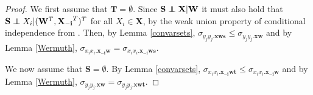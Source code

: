 \documentclass[11pt,a4paper]{article}
\theoremstyle{definition}
\theoremstyle{remark}
\newcommand\ci{\protect\mathpalette{\protect\independenT}{\perp}}
\def\independenT#1#2{\mathrel{\rlap{$#1#2$}\mkern2mu{#1#2}}}
\begin{document}
\begin{proof}

We first assume that $\mathbf{T} = \emptyset$. Since $\mathbf{S} \ci \mathbf{X} | \mathbf{W}$ it must also hold that $\mathbf{S} \ci X_i | (\mathbf{W}^T, \mathbf{X_{-i}}^T)^T$ for all $X_i \in \mathbf{X}$, by the weak union property of conditional independence from \cite{dawid1979conditional}. Then,  by Lemma \ref{convarsets}, $\sigma_{y_jy_j.\mathbf{xws}} \leq \sigma_{y_jy_j.\mathbf{xw}}$ and by Lemma \ref{Wermuth}, $\sigma_{x_ix_i.\mathbf{x_{-i}w}} = \sigma_{x_ix_i.\mathbf{x_{-i}ws}}$. 

We now assume that $\mathbf{S} = \emptyset$. By Lemma \ref{convarsets}, $\sigma_{x_ix_i.\mathbf{x_{-i}wt}} \leq \sigma_{x_ix_i.\mathbf{x_{-i}w}}$ and by Lemma \ref{Wermuth}, $\sigma_{y_jy_j.\mathbf{xw}} = \sigma_{y_jy_j.\mathbf{xwt}}$.


\end{proof}
\end{document}

